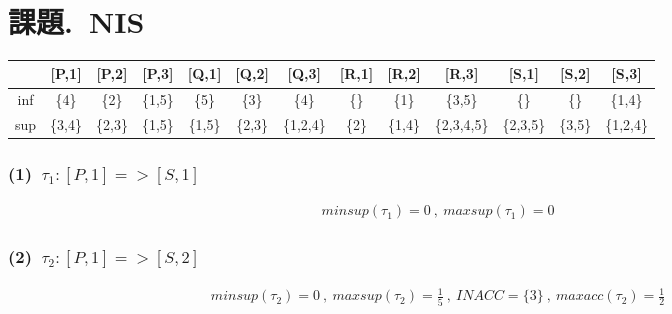 \documentclass[a4paper,12pt]{jarticle}
\begin{document}
%
\title{\vspace{-30mm} }
\date{}
%
\maketitle
%
\vspace{-30mm}
%
\setlength{\abovedisplayskip}{0pt} %
\setlength{\belowdisplayskip}{0pt} %

\section*{課題.~NIS}
\vspace{-3mm}
%
 \begin{table}[htbp]
  \fontsize{10pt}{11pt}\selectfont
  \begin{tabular}{c|cccccccccccc}
       &[P,1]&[P,2]&[P,3]&[Q,1]&[Q,2]&[Q,3]&[R,1]&[R,2]&[R,3]&[S,1]&[S,2]&[S,3]\\\hline
   inf &\{4\}&\{2\}&\{1,5\}&\{5\}&\{3\}&\{4\}&\{\}&\{1\}&\{3,5\}&\{\}&\{\}&\{1,4\}\\
   sup &\{3,4\}&\{2,3\}&\{1,5\}&\{1,5\}&\{2,3\}&\{1,2,4\}&\{2\}&\{1,4\}&\{2,3,4,5\}&\{2,3,5\}&\{3,5\}&\{1,2,4\} 
  \end{tabular}
 \end{table}
%
\vspace{-10mm} 
\subsubsection*{(1)~$\tau_1:[P,1]=>[S,1]$}
\vspace{-4mm}
%
\begin{align*}
 minsup(\tau_1)=0~,~maxsup(\tau_1)=0
\end{align*}
%
\vspace{-10mm}
\subsubsection*{(2)~$\tau_2:[P,1]=>[S,2]$}
\vspace{-4mm}
%
\begin{align*}
 minsup(\tau_2)=0~,~maxsup(\tau_2)=\frac{1}{5}~,~INACC=\{3\}~,~maxacc(\tau_2)=\frac{1}{2}
\end{align*}
%
\vspace{-10mm}
\end{document}
